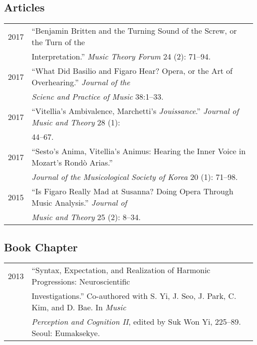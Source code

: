 \documentclass[a4paper,11pt]{article}
\begin{document}
  \subsection*{Articles}
  \hspace*{-0.25cm}
  \begin{tabular}{p{2.5cm} p{12.5cm}}
    2017 & ``Benjamin Britten and the Turning Sound of the Screw, or the Turn of the\\ 
    & Interpretation.'' \textit{Music Theory Forum} 24 (2): 71--94.\\[2mm]
    
    2017 & ``What Did Basilio and Figaro Hear? Opera, or the Art of Overhearing.'' \textit{Journal of the}\\ 
    & \textit{Scienc and Practice of Music} 38:1--33.\\[2mm]
    
    2017 & ``Vitellia's Ambivalence, Marchetti's \textit{Jouissance}.'' \textit{Journal of Music and Theory} 28 (1):\\
    & 44--67.\\[2mm]
    
    2017 & ``Sesto's Anima, Vitellia's Animus: Hearing the Inner Voice in Mozart's Rond\`{o} Arias.''\\
    & \textit{Journal of the Musicological Society of Korea} 20 (1): 71--98.\\[2mm]
    
    2015 & ``Is Figaro Really Mad at Susanna? Doing Opera Through Music Analysis.'' \textit{Journal of}\\
    & \textit{Music and Theory} 25 (2): 8--34.
  \end{tabular}
    
  \subsection*{Book Chapter}
  \hspace*{-0.25cm}
  \begin{tabular}{p{2.5cm} p{12.5cm}}
    2013 & “Syntax, Expectation, and Realization of Harmonic Progressions: Neuroscientific\\
    & Investigations.” Co-authored with S. Yi, J. Seo, J. Park, C. Kim, and D. Bae. In \textit{Music} \\
    & \textit{Perception and Cognition II}, edited by Suk Won Yi, 225–89. Seoul: Eumaksekye.
  \end{tabular}
    
\end{document}
